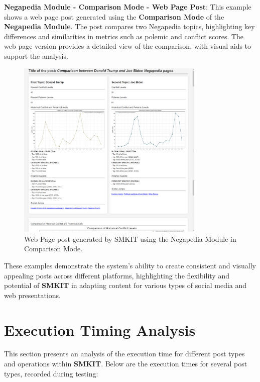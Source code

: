 \textbf{Negapedia Module - Comparison Mode - Web Page Post}:  
This example shows a web page post generated using the \textbf{Comparison Mode} of the \textbf{Negapedia Module}. The post compares two Negapedia topics, highlighting key differences and similarities in metrics such as polemic and conflict scores. The web page version provides a detailed view of the comparison, with visual aids to support the analysis.

\begin{figure}[H]
    \centering
    \includegraphics[width=0.8\textwidth]{figures/results/negapedia_module/comparison_mode/web_page/web_page_negapedia_comparison_post_screenshot.png}
    \caption{Web Page post generated by SMKIT using the Negapedia Module in Comparison Mode.}
    \label{fig:web_page_negapedia_comparison_post_screenshot}
\end{figure}

These examples demonstrate the system’s ability to create consistent and visually appealing posts across different platforms, highlighting the flexibility and potential of \textbf{SMKIT} in adapting content for various types of social media and web presentations.


\section{Execution Timing Analysis}
\label{sec:execution_timing_analysis}
This section presents an analysis of the execution time for different post types and operations within \textbf{SMKIT}. Below are the execution times for several post types, recorded during testing:

